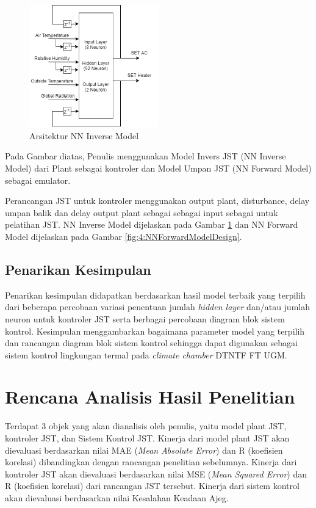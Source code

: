\begin{figure}[!t]
	\centering
	\includegraphics[width=0.5\textwidth]{figures/NNInverseModelDesign}
	\caption{Arsitektur NN Inverse Model}
	\label{fig:4:NNInverseModelDesign}
\end{figure}

Pada Gambar diatas, Penulis menggunakan Model Invers JST (NN Inverse Model) dari Plant sebagai kontroler dan Model Umpan JST (NN Forward Model) sebagai emulator.

Perancangan JST untuk kontroler menggunakan output plant, disturbance, delay umpan balik dan delay output plant sebagai sebagai input sebagai untuk pelatihan JST. NN Inverse Model dijelaskan pada Gambar \ref{fig:4:NNInverseModelDesign} dan NN Forward Model dijelaskan pada Gambar \ref{fig:4:NNForwardModelDesign}.\\

\subsection{{Penarikan Kesimpulan}}
Penarikan kesimpulan didapatkan berdasarkan hasil model terbaik yang terpilih dari beberapa percobaan variasi penentuan jumlah \textit{hidden layer} dan/atau jumlah neuron untuk kontroler JST serta berbagai percobaan diagram blok sistem kontrol. Kesimpulan menggambarkan bagaimana parameter model yang terpilih dan rancangan diagram blok sistem kontrol sehingga dapat digunakan sebagai sistem kontrol lingkungan termal pada \textit{climate chamber} DTNTF FT UGM.

\section{Rencana Analisis Hasil Penelitian}
Terdapat 3 objek yang akan dianalisis oleh penulis, yaitu model plant JST, kontroler JST, dan Sistem Kontrol JST. Kinerja dari model plant JST akan dievaluasi berdasarkan nilai MAE (\textit{Mean Absolute Error}) dan R (koefisien korelasi) dibandingkan dengan rancangan penelitian sebelumnya. Kinerja dari kontroler  JST akan dievaluasi berdasarkan nilai MSE (\textit{Mean Squared Error}) dan R (koefisien korelasi) dari rancangan JST tersebut. Kinerja dari sistem kontrol akan dievaluasi berdasarkan nilai Kesalahan Keadaan Ajeg.